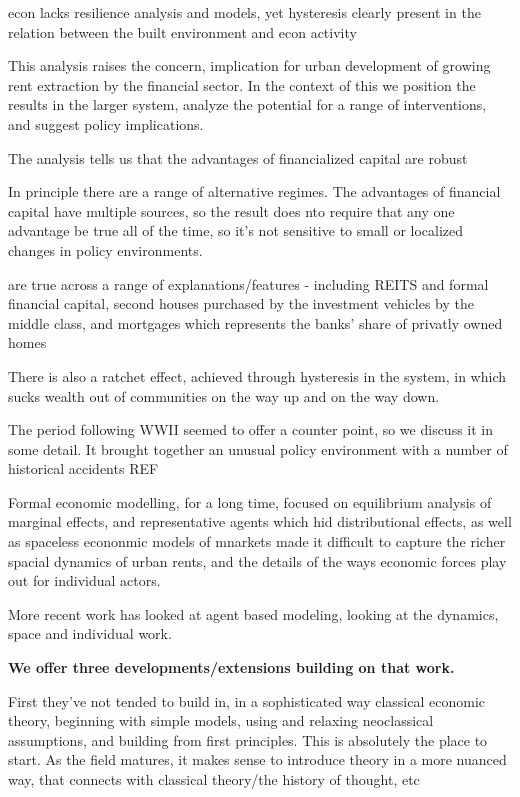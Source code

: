 econ lacks resilience analysis and models, yet hysteresis clearly present in the relation between the built environment and econ activity

This analysis raises the concern, implication for urban development of growing rent extraction by the financial sector.   In the context of this we position the results in the larger system, analyze the potential for a range of interventions, and suggest policy implications.



The analysis tells us that the advantages of financialized capital are robust 

In principle there are a range of alternative regimes.
The advantages of financial capital have multiple sources, so the result does nto require that any one advantage be true all of the time, so it's not sensitive to small or localized changes in policy environments.

are true across a range of explanations/features - including REITS and formal financial capital, second houses purchased by the investment vehicles by the middle class, and mortgages which represents the banks' share of privatly owned homes

There is also a ratchet effect, achieved through hysteresis in the system, in which sucks wealth out of communities on the way up and on the way down.

The period following WWII seemed to offer a counter point, so we discuss it in some detail. It brought together an unusual policy environment with a number of historical accidents REF




Formal economic modelling, for a long time, focused on equilibrium analysis of marginal effects, and representative agents which hid distributional effects, as well as spaceless econonmic models of mnarkets made it difficult to capture the richer spacial dynamics of urban rents, and the details of the ways economic forces play out for individual actors.

More recent work has looked at agent based modeling, looking at the dynamics, space and individual work. 

\textbf{We offer three developments/extensions building on that work.}

First they've not tended to build in, in a sophisticated way classical economic theory, beginning with simple models, using and relaxing neoclassical assumptions, and building from first principles. This is absolutely the place to start. As the field matures, it makes sense to introduce theory in a more nuanced way, that connects with classical theory/the history of thought, etc


